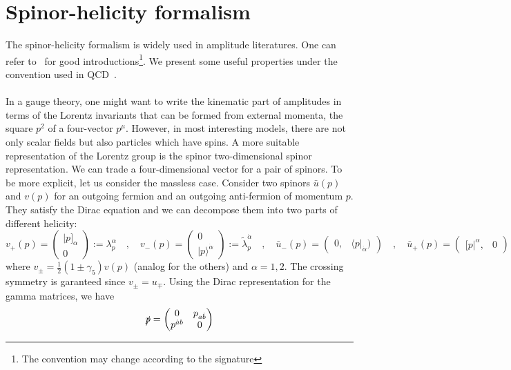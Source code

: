 \section{Spinor-helicity formalism}
The spinor-helicity formalism is widely used in amplitude literatures. 
One can refer to~\cite{Dixon:1996wi,Elvang:2013cua} for good introductions\footnote{The convention may change according to the signature}.
We present some useful properties under the convention used in QCD~\cite{Dixon:1996wi}.
\\\\
In a gauge theory, one might want to write the kinematic part of amplitudes in terms of the Lorentz invariants that can be formed from external momenta, \eg the square $p^2$ of a four-vector $p^\mu$.
However, in most interesting models, there are not only scalar fields but also particles which have spins. 
A more suitable representation of the Lorentz group is the spinor two-dimensional spinor representation.
We can trade a four-dimensional vector for a pair of spinors.
To be more explicit, let us consider the massless case.
Consider two spinors $\bar{u}(p)$ and $v(p)$ for an outgoing fermion and an outgoing anti-fermion of momentum $p$.
They satisfy the Dirac equation and we can decompose them into two parts of different helicity:
\begin{equation*}
v_+(p) = \begin{pmatrix}
|p]_\alpha \\ 0
\end{pmatrix} := \lambda_p^\alpha
\quad,\quad
v_-(p) = \begin{pmatrix}
0 \\ |p\rangle^{\dot{\alpha}}
\end{pmatrix} := \tilde{\lambda}_p^{\dot{\alpha}}
\quad,\quad
\bar{u}_-(p) = \begin{pmatrix} 
0, & \langle p |_{\dot{\alpha}})\end{pmatrix}
\quad,\quad
\bar{u}_+(p) = \begin{pmatrix} [ p|^\alpha, & 0 \end{pmatrix}
\end{equation*} 
where $v_\pm = \frac{1}{2}(1\pm\gamma_5)v(p)$ (analog for the others) and $\alpha = 1,2$.
The crossing symmetry is garanteed since $v_\pm = u_\mp$.
Using the Dirac representation for the gamma matrices, 
we have
\begin{equation*}
\slashed{p} = \begin{pmatrix}
0 & p_{a\dot{b}} \\ 
p^{\dot{a}b} & 0
\end{pmatrix}
\end{equation*}
